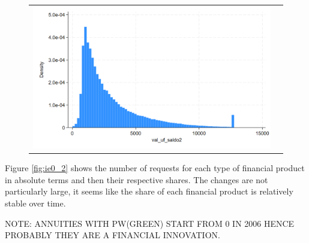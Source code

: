 \documentclass[12pt]{article}
\begin{document}
\begin{figure}[H]
\caption{}
\label{fig:ie0_1}
\centering{}%
\begin{tabular}{cc}
\includegraphics[scale=0.27]{figures/IE0_plot1.png} 
\end{tabular}
\end{figure}



Figure \ref{fig:ie0_2} shows the number of requests for each type of financial product in absolute terms and then their respective shares. The changes are not particularly large, it seems like the share of each financial product is relatively stable over time.

NOTE: ANNUITIES WITH PW(GREEN) START FROM 0 IN 2006 HENCE PROBABLY THEY ARE A FINANCIAL INNOVATION. 
\end{document}
